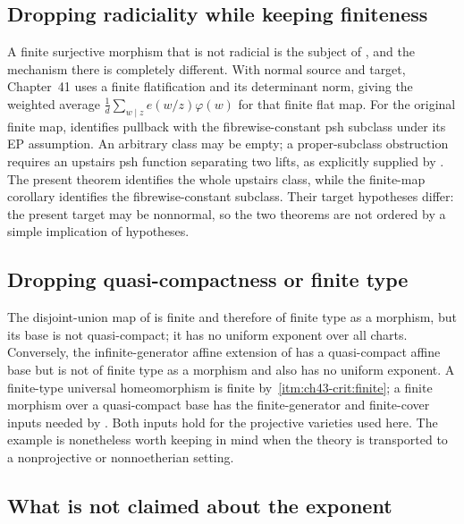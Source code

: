 \subsection{Dropping radiciality while keeping finiteness}
\label{sec:ch43-failure-radicial}

A finite surjective morphism that is not radicial is the subject of
, and the mechanism there is completely
different.  With normal source and target, Chapter~41 uses a finite
flatification and its determinant norm, giving the weighted average
$\frac1d\sum_{w\mid z}e(w/z)\varphi(w)$ for that finite flat map.
For the original finite map, 
identifies pullback with the fibrewise-constant psh subclass under its
EP assumption.  An arbitrary class may be empty; a proper-subclass
obstruction requires an upstairs psh function separating two lifts,
as explicitly supplied by .
The present theorem identifies the whole upstairs class, while the
finite-map corollary identifies the fibrewise-constant subclass.
Their target hypotheses differ: the present target may be nonnormal,
so the two theorems are not ordered by a simple implication of hypotheses.

\subsection{Dropping quasi-compactness or finite type}
\label{sec:ch43-failure-compact}

The disjoint-union map of  is finite
and therefore of finite type as a morphism, but its base is not
quasi-compact; it has no uniform exponent over all charts.
Conversely, the infinite-generator affine extension of
 has a quasi-compact affine base
but is not of finite type as a morphism and also has no uniform exponent.
A finite-type universal homeomorphism is finite by
\,\cref{itm:ch43-crit:finite}; a finite
morphism over a quasi-compact base has the finite-generator and finite-cover
inputs needed by .
Both inputs hold for the projective varieties used here.  The
example is nonetheless worth keeping in mind when the theory is transported
to a nonprojective or nonnoetherian setting.

\subsection{What is not claimed about the exponent}
\label{sec:ch43-failure-exponent}

